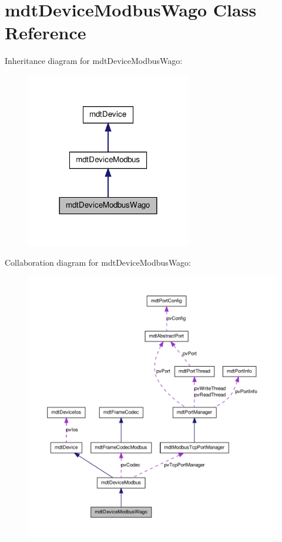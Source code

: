 \hypertarget{classmdt_device_modbus_wago}{
\section{mdtDeviceModbusWago Class Reference}
\label{classmdt_device_modbus_wago}
}


Inheritance diagram for mdtDeviceModbusWago:
\nopagebreak
\begin{figure}[H]
\begin{center}
\leavevmode
\includegraphics[width=204pt]{classmdt_device_modbus_wago__inherit__graph}
\end{center}
\end{figure}


Collaboration diagram for mdtDeviceModbusWago:
\nopagebreak
\begin{figure}[H]
\begin{center}
\leavevmode
\includegraphics[width=400pt]{classmdt_device_modbus_wago__coll__graph}
\end{center}
\end{figure}
